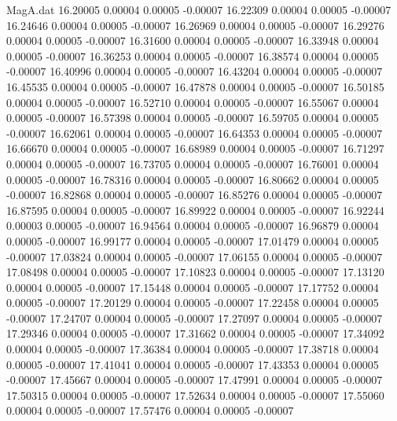 \begin{filecontents}{MagA.dat}
  16.20005    0.00004    0.00005   -0.00007
  16.22309    0.00004    0.00005   -0.00007
  16.24646    0.00004    0.00005   -0.00007
  16.26969    0.00004    0.00005   -0.00007
  16.29276    0.00004    0.00005   -0.00007
  16.31600    0.00004    0.00005   -0.00007
  16.33948    0.00004    0.00005   -0.00007
  16.36253    0.00004    0.00005   -0.00007
  16.38574    0.00004    0.00005   -0.00007
  16.40996    0.00004    0.00005   -0.00007
  16.43204    0.00004    0.00005   -0.00007
  16.45535    0.00004    0.00005   -0.00007
  16.47878    0.00004    0.00005   -0.00007
  16.50185    0.00004    0.00005   -0.00007
  16.52710    0.00004    0.00005   -0.00007
  16.55067    0.00004    0.00005   -0.00007
  16.57398    0.00004    0.00005   -0.00007
  16.59705    0.00004    0.00005   -0.00007
  16.62061    0.00004    0.00005   -0.00007
  16.64353    0.00004    0.00005   -0.00007
  16.66670    0.00004    0.00005   -0.00007
  16.68989    0.00004    0.00005   -0.00007
  16.71297    0.00004    0.00005   -0.00007
  16.73705    0.00004    0.00005   -0.00007
  16.76001    0.00004    0.00005   -0.00007
  16.78316    0.00004    0.00005   -0.00007
  16.80662    0.00004    0.00005   -0.00007
  16.82868    0.00004    0.00005   -0.00007
  16.85276    0.00004    0.00005   -0.00007
  16.87595    0.00004    0.00005   -0.00007
  16.89922    0.00004    0.00005   -0.00007
  16.92244    0.00003    0.00005   -0.00007
  16.94564    0.00004    0.00005   -0.00007
  16.96879    0.00004    0.00005   -0.00007
  16.99177    0.00004    0.00005   -0.00007
  17.01479    0.00004    0.00005   -0.00007
  17.03824    0.00004    0.00005   -0.00007
  17.06155    0.00004    0.00005   -0.00007
  17.08498    0.00004    0.00005   -0.00007
  17.10823    0.00004    0.00005   -0.00007
  17.13120    0.00004    0.00005   -0.00007
  17.15448    0.00004    0.00005   -0.00007
  17.17752    0.00004    0.00005   -0.00007
  17.20129    0.00004    0.00005   -0.00007
  17.22458    0.00004    0.00005   -0.00007
  17.24707    0.00004    0.00005   -0.00007
  17.27097    0.00004    0.00005   -0.00007
  17.29346    0.00004    0.00005   -0.00007
  17.31662    0.00004    0.00005   -0.00007
  17.34092    0.00004    0.00005   -0.00007
  17.36384    0.00004    0.00005   -0.00007
  17.38718    0.00004    0.00005   -0.00007
  17.41041    0.00004    0.00005   -0.00007
  17.43353    0.00004    0.00005   -0.00007
  17.45667    0.00004    0.00005   -0.00007
  17.47991    0.00004    0.00005   -0.00007
  17.50315    0.00004    0.00005   -0.00007
  17.52634    0.00004    0.00005   -0.00007
  17.55060    0.00004    0.00005   -0.00007
  17.57476    0.00004    0.00005   -0.00007

\end{filecontents}
